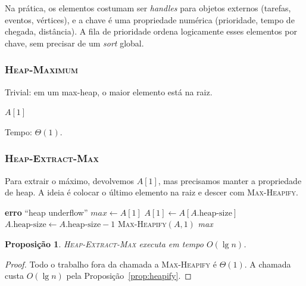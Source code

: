 \documentclass[9pt,a4paper]{extarticle}
\newcommand{\ntc}[1]{\textcolor{notice}{#1}}
\newtheorem{proposition}[theorem]{Proposição}
\theoremstyle{definition}
\begin{document}
\ntc{Na prática}, os elementos costumam ser \textit{handles} para objetos
externos (tarefas, eventos, vértices), e a chave é uma propriedade
numérica (prioridade, tempo de chegada, distância). A fila de prioridade
ordena logicamente esses elementos por chave, sem precisar de um
\textit{sort} global.
 
\subsubsection{\textsc{Heap-Maximum}}
 
Trivial: em um max-heap, o maior elemento está na raiz.
 
\begin{algorithm}[H]
\caption{\textsc{Heap-Maximum}$(A)$}
\begin{algorithmic}[1]
\State \Return $A[1]$
\end{algorithmic}
\end{algorithm}
 
Tempo: $\Theta(1)$.
 
\subsubsection{\textsc{Heap-Extract-Max}}
 
Para extrair o máximo, devolvemos $A[1]$, mas precisamos manter a
propriedade de heap. A ideia é colocar o último elemento na raiz e
descer com \textsc{Max-Heapify}.
 
\begin{algorithm}[H]
\caption{\textsc{Heap-Extract-Max}$(A)$}
\begin{algorithmic}[1]
  \State \textbf{erro} ``heap underflow''
\EndIf
\State $\textit{max} \gets A[1]$
\State $A[1] \gets A[A.\text{heap-size}]$
\State $A.\text{heap-size} \gets A.\text{heap-size} - 1$
\State \textsc{Max-Heapify}$(A, 1)$
\State \Return \textit{max}
\end{algorithmic}
\end{algorithm}
 
\begin{proposition}
\textsc{Heap-Extract-Max} executa em tempo $O(\lg n)$.
\end{proposition}
 
\begin{proof}
Todo o trabalho fora da chamada a \textsc{Max-Heapify} é $\Theta(1)$. A
chamada custa $O(\lg n)$ pela Proposição~\ref{prop:heapify}.
\end{proof}
 
\end{document}
